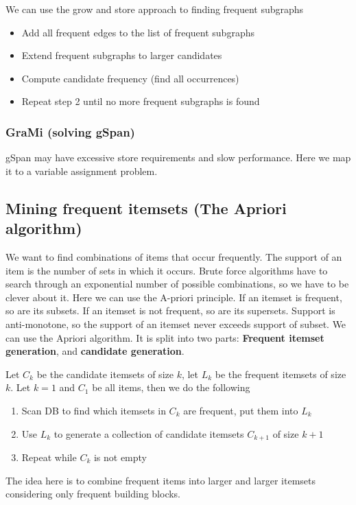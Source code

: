     We can use the grow and store approach to finding frequent subgraphs
    
    \begin{itemize}
        \item Add all frequent edges to the list of frequent subgraphs
        \item Extend frequent subgraphs to larger candidates
        \item Compute candidate frequency (find all occurrences)
        \item Repeat step 2 until no more frequent subgraphs is found
    \end{itemize}
    
\subsubsection{GraMi (solving gSpan)}
    gSpan may have excessive store requirements and slow performance. Here we map it to a variable assignment problem. 
    
\subsection{Mining frequent itemsets (The Apriori algorithm)}
    We want to find combinations of items that occur frequently. The support of an item is the number of sets in which it occurs. Brute force algorithms have to search through an exponential number of possible combinations, so we have to be clever about it. Here we can use the A-priori principle. If an itemset is frequent, so are its subsets. If an itemset is not frequent, so are its supersets. Support is anti-monotone, so the support of an itemset never exceeds support of subset. We can use the Apriori algorithm. It is split into two parts: \textbf{Frequent itemset generation}, and \textbf{candidate generation}.
    
    
    Let $C_k$ be the candidate itemsets of size $k$, let $L_k$ be the frequent itemsets of size $k$. Let $k = 1$ and $C_1$ be all items, then we do the following
    \begin{enumerate}
        \item Scan DB to find which itemsets in $C_k$ are frequent, put them into $L_k$
        \item Use $L_k$ to generate a collection of candidate itemsets $C_{k+1}$ of size $k+1$
        \item Repeat while $C_k$ is not empty
    \end{enumerate}
    The idea here is to combine frequent items into larger and larger itemsets considering only frequent building blocks.
    
